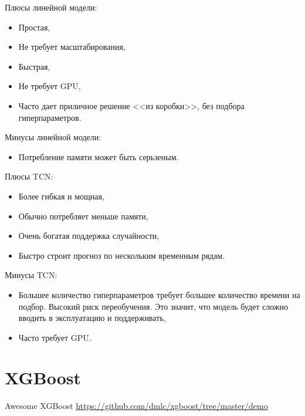\documentclass[%
	11pt,
	a4paper,
	utf8,
		]{article}
\begin{document}
Плюсы линейной модели:
\begin{itemize}
	\item Простая,
	
	\item Не требует масштабирования,
	
	\item Быстрая,
	
	\item Не требует GPU,
	
    \item Часто дает приличное решение <<из коробки>>, без подбора гиперпараметров.
\end{itemize}

Минусы линейной модели:
\begin{itemize}
	\item Потребление памяти может быть серьзеным.
\end{itemize}

Плюсы TCN:
\begin{itemize}
	\item Более гибкая и мощная,
	
	\item Обычно потребляет меньше памяти,
	
	\item Очень богатая поддержка случайности,
	
	\item Быстро строит прогноз по нескольким временным рядам.
\end{itemize}

Минусы TCN:
\begin{itemize}
	\item Большее количество гиперпараметров требует большее количество времени на подбор. Высокий риск переобучения. Это значит, что модель будет сложно вводить в эксплуатацию и поддерживать,
	
	\item Часто требует GPU.
\end{itemize}










\section{XGBoost}

Awesome XGBoost \url{https://github.com/dmlc/xgboost/tree/master/demo}
\end{document}
